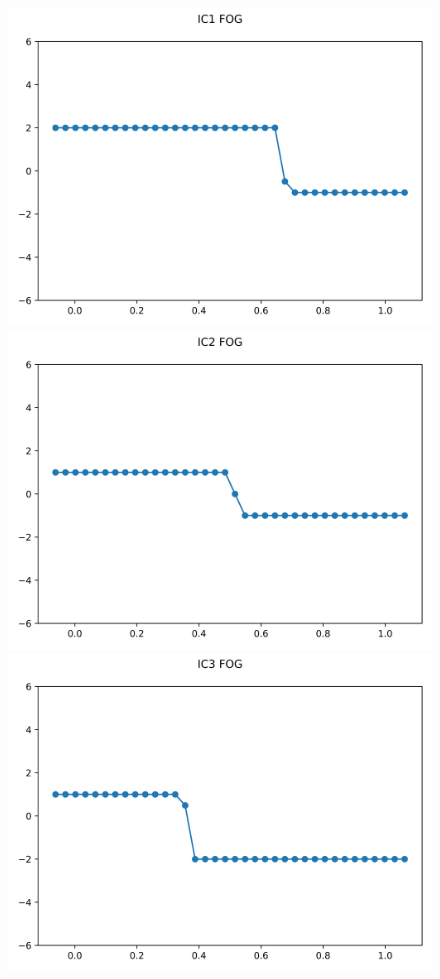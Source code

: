 \documentclass{article}
\begin{document}
\begin{figure}[t]
        \centering
        \includegraphics[width=.95\textwidth]{../../code/unsafe_IC1Methodfu_plot.png}
        \includegraphics[width=.95\textwidth]{../../code/unsafe_IC2Methodfu_plot.png}
        \includegraphics[width=.95\textwidth]{../../code/unsafe_IC3Methodfu_plot.png}

\end{figure}
\end{document}
